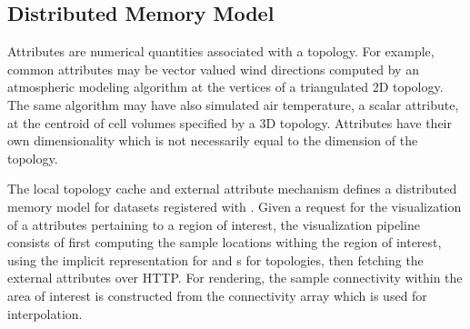 \subsection{Distributed Memory Model}
Attributes are numerical quantities associated with a topology. For
example, common attributes may be vector valued wind directions computed by an
atmospheric modeling algorithm at the vertices of a triangulated 2D
topology. The same algorithm may have also simulated air temperature,
a scalar attribute, at the centroid of cell volumes specified by a 3D
topology. Attributes have their own dimensionality which is not
necessarily equal to the dimension of the topology.

The local topology cache and external attribute mechanism defines a
distributed memory model for datasets registered with \sciwms{}. Given
a request for the visualization of a attributes pertaining to a region
of interest, the visualization pipeline consists of first computing
the sample locations withing the region of interest, using the
implicit representation for \cgrid{} and \rtree{}s for \ugrid{}
topologies, then fetching the external attributes over HTTP. For
rendering, the sample connectivity within the area of interest is
constructed from the connectivity array which is used for
interpolation.
